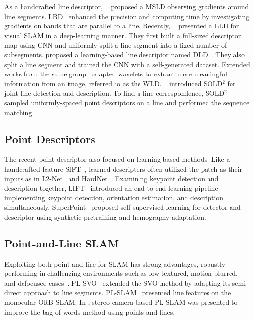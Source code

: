 \documentclass[letterpaper, 10 pt, journal, twoside]{ieeetran}
\begin{document}
As a handcrafted line descriptor, \citeauthor{MSLD2009}~\cite{MSLD2009} proposed a \ac{MSLD} observing gradients around line segments. \ac{LBD}~\cite{LBD2013} enhanced the precision and computing time by investigating gradients on bands that are parallel to a line. Recently, \citeauthor{LLD2019}~\cite{LLD2019} presented a \ac{LLD} for visual \ac{SLAM} in a deep-learning manner. They first built a full-sized descriptor map using \ac{CNN} and uniformly split a line segment into a fixed-number of subsegments. \citeauthor{DLD2019} proposed a learning-based line descriptor named DLD~\cite{DLD2019}. They also split a line segment and trained the \ac{CNN} with a self-generated dataset. Extended works from the same group~\cite{WLD2020} adapted wavelets to extract more meaningful information from an image, referred to as the \ac{WLD}. \citeauthor{Pautrat2021}~\cite{Pautrat2021} introduced SOLD$^2$ for joint line detection and description. To find a line correspondence, SOLD$^2$ sampled uniformly-spaced point descriptors on a line and performed the sequence matching.

\subsection{Point Descriptors}

The recent point descriptor also focused on learning-based methods. Like a handcrafted feature SIFT~\cite{Lowe2004}, learned descriptors often utilized the patch as their inputs as in L2-Net~\cite{Tian2017} and HardNet~\cite{Mishchuk2017}. Examining keypoint detection and description together, LIFT~\cite{Yi2016} introduced an end-to-end learning pipeline implementing keypoint detection, orientation estimation, and description simultaneously. SuperPoint~\cite{DeTone2017} proposed self-supervised learning for detector and descriptor using synthetic pretraining and homography adaptation.








\subsection{Point-and-Line \ac{SLAM}}

Exploiting both point and line for \ac{SLAM} has strong advantages, robustly performing in challenging environments such as low-textured, motion blurred, and defocused cases~\cite{Gomez2016, Pumarola2017, Gomez2019, Yang2019}. PL-SVO~\cite{Gomez2016} extended the SVO method by adapting its semi-direct approach to line segments. PL-SLAM~\cite{Pumarola2017} presented line features on the monocular ORB-SLAM. In \cite{Gomez2019}, stereo camera-based PL-SLAM was presented to improve the bag-of-words method using points and lines.
\end{document}
